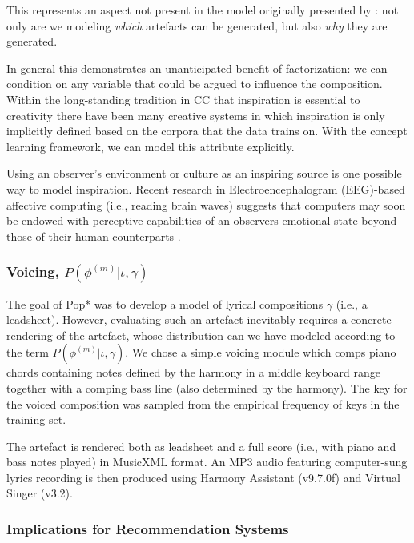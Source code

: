 \documentclass[letterpaper]{article}
\begin{document}
This represents an aspect not present in the model originally presented by \cite{lake2015human}: not only are we modeling \textit{which} artefacts can be generated, but also \textit{why} they are generated. 

In general this demonstrates an unanticipated benefit of factorization: we can condition on any variable that could be argued to influence the composition. Within the long-standing tradition in CC that inspiration is essential to creativity there have been many creative systems in which inspiration is only implicitly defined based on the corpora that the data trains on. With the concept learning framework, we can model this attribute explicitly.

Using an observer's environment or culture as an inspiring source is one possible way to model inspiration. Recent research in Electroencephalogram (EEG)-based affective computing (i.e., reading brain waves) suggests that computers may soon be endowed with perceptive capabilities of an observers emotional state beyond those of their human counterparts \cite{volioti2016mapping}.

\subsubsection{Voicing, $P(\phi^{(m)}|\iota,\gamma)$}

The goal of Pop* was to develop a model of lyrical compositions $\gamma$ (i.e., a leadsheet). However, evaluating such an artefact inevitably requires a concrete rendering of the artefact, whose distribution can we have modeled according to the term $P(\phi^{(m)}|\iota,\gamma)$. We chose a simple voicing module which comps piano chords containing notes defined by the harmony in a middle keyboard range together with a comping bass line (also determined by the harmony). The key for the voiced composition was sampled from the empirical frequency of keys in the training set. 

The artefact is rendered both as leadsheet and a full score (i.e., with piano and bass notes played) in MusicXML format. An MP3 audio featuring computer-sung lyrics recording is then produced using Harmony Assistant (v9.7.0f) and Virtual Singer (v3.2).

\subsubsection{Implications for Recommendation Systems}
\end{document}
